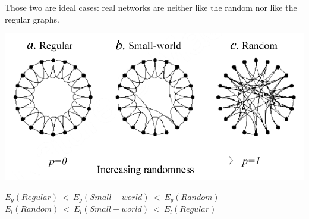 \documentclass[12pt]{article}
\begin{document}
\vspace{20px}

Those two are ideal cases: real networks are neither like the random nor like the regular graphs. 

\begin{center}
	\includegraphics[scale=0.4]{images/real_network.png}
\end{center}

\begin{center}
	$ E_g (Regular)\ <\ E_g(Small-world)\ <\ E_g(Random)$
	$ E_l (Random)\ <\ E_l(Small-world)\ <\ E_l(Regular)$
\end{center}
\end{document}

